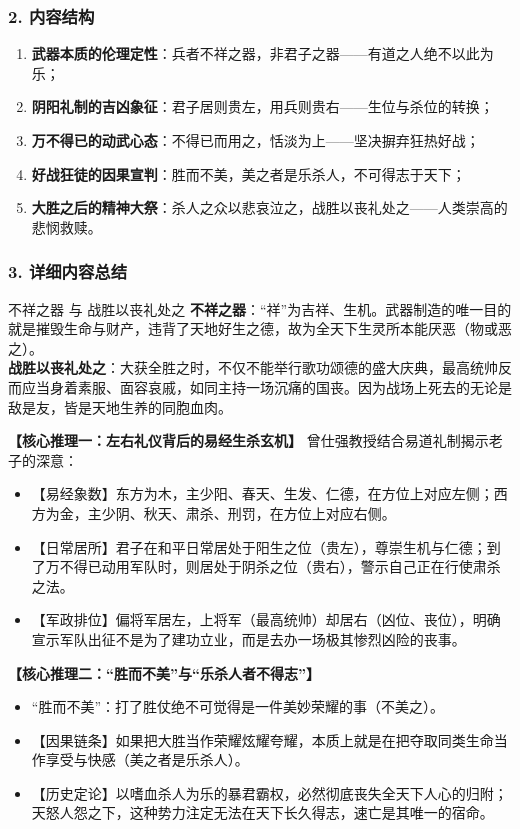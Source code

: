 \subsubsection{2. 内容结构}
\begin{enumerate}
    \item \textbf{武器本质的伦理定性}：兵者不祥之器，非君子之器——有道之人绝不以此为乐；
    \item \textbf{阴阳礼制的吉凶象征}：君子居则贵左，用兵则贵右——生位与杀位的转换；
    \item \textbf{万不得已的动武心态}：不得已而用之，恬淡为上——坚决摒弃狂热好战；
    \item \textbf{好战狂徒的因果宣判}：胜而不美，美之者是乐杀人，不可得志于天下；
    \item \textbf{大胜之后的精神大祭}：杀人之众以悲哀泣之，战胜以丧礼处之——人类崇高的悲悯救赎。
\end{enumerate}

\subsubsection{3. 详细内容总结}

\begin{ConceptBox}{不祥之器 与 战胜以丧礼处之}
\textbf{不祥之器}：“祥”为吉祥、生机。武器制造的唯一目的就是摧毁生命与财产，违背了天地好生之德，故为全天下生灵所本能厌恶（物或恶之）。\\
\textbf{战胜以丧礼处之}：大获全胜之时，不仅不能举行歌功颂德的盛大庆典，最高统帅反而应当身着素服、面容哀戚，如同主持一场沉痛的国丧。因为战场上死去的无论是敌是友，皆是天地生养的同胞血肉。
\end{ConceptBox}

\noindent\textbf{【核心推理一：左右礼仪背后的易经生杀玄机】}
曾仕强教授结合易道礼制揭示老子的深意：
\begin{itemize}
    \item 【易经象数】东方为木，主少阳、春天、生发、仁德，在方位上对应左侧；西方为金，主少阴、秋天、肃杀、刑罚，在方位上对应右侧。
    \item 【日常居所】君子在和平日常居处于阳生之位（贵左），尊崇生机与仁德；到了万不得已动用军队时，则居处于阴杀之位（贵右），警示自己正在行使肃杀之法。
    \item 【军政排位】偏将军居左，上将军（最高统帅）却居右（凶位、丧位），明确宣示军队出征不是为了建功立业，而是去办一场极其惨烈凶险的丧事。
\end{itemize}

\noindent\textbf{【核心推理二：“胜而不美”与“乐杀人者不得志”】}
\begin{itemize}
    \item “胜而不美”：打了胜仗绝不可觉得是一件美妙荣耀的事（不美之）。
    \item 【因果链条】如果把大胜当作荣耀炫耀夸耀，本质上就是在把夺取同类生命当作享受与快感（美之者是乐杀人）。
    \item 【历史定论】以嗜血杀人为乐的暴君霸权，必然彻底丧失全天下人心的归附；天怒人怨之下，这种势力注定无法在天下长久得志，速亡是其唯一的宿命。
\end{itemize}

